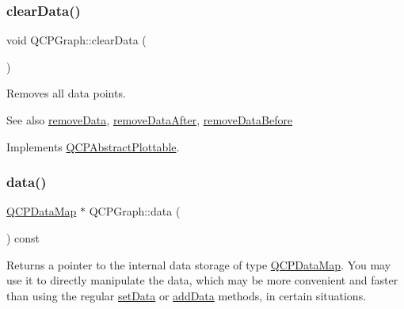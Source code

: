 \subsubsection{\texorpdfstring{clear\+Data()}{clearData()}}
{\footnotesize\ttfamily void Q\+C\+P\+Graph\+::clear\+Data (\begin{DoxyParamCaption}{ }\end{DoxyParamCaption})\hspace{0.3cm}{\ttfamily [virtual]}}

Removes all data points. \begin{DoxySeeAlso}{See also}
\hyperlink{class_q_c_p_graph_a4a0fde50b7db9db0a85b5c5b6b10098f}{remove\+Data}, \hyperlink{class_q_c_p_graph_ae42d645ef617cfc75fc0df58e62c522a}{remove\+Data\+After}, \hyperlink{class_q_c_p_graph_a9fe0b3e54e8c7b61319bd03337e21e99}{remove\+Data\+Before} 
\end{DoxySeeAlso}


Implements \hyperlink{class_q_c_p_abstract_plottable_a86e5b8fd4b6ff4f4084e7ea4c573fc53}{Q\+C\+P\+Abstract\+Plottable}.

\hypertarget{class_q_c_p_graph_acde1c0d1f6a817930489548396e6b3e6}{}\label{class_q_c_p_graph_acde1c0d1f6a817930489548396e6b3e6} 
\subsubsection{\texorpdfstring{data()}{data()}}
{\footnotesize\ttfamily \hyperlink{qcustomplot_8h_a84a9c4a4c2216ccfdcb5f3067cda76e3}{Q\+C\+P\+Data\+Map} $\ast$ Q\+C\+P\+Graph\+::data (\begin{DoxyParamCaption}{ }\end{DoxyParamCaption}) const\hspace{0.3cm}{\ttfamily [inline]}}

Returns a pointer to the internal data storage of type \hyperlink{qcustomplot_8h_a84a9c4a4c2216ccfdcb5f3067cda76e3}{Q\+C\+P\+Data\+Map}. You may use it to directly manipulate the data, which may be more convenient and faster than using the regular \hyperlink{class_q_c_p_graph_a1df2fd710545c8ba3b2c99a39a27bf8b}{set\+Data} or \hyperlink{class_q_c_p_graph_aa5c6181d84db72ce4dbe9dc15a34ef4f}{add\+Data} methods, in certain situations. \hypertarget{class_q_c_p_graph_ae6425d5df537c08159f794cb18c051c3}{}\label{class_q_c_p_graph_ae6425d5df537c08159f794cb18c051c3} 
